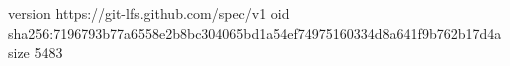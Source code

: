 version https://git-lfs.github.com/spec/v1
oid sha256:7196793b77a6558e2b8bc304065bd1a54ef74975160334d8a641f9b762b17d4a
size 5483
